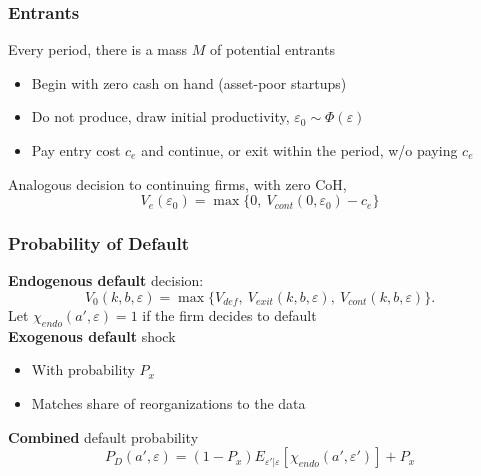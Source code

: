 \documentclass[aspectratio=169,xcolor=table]{beamer}
\begin{document}
\begin{frame}[label=Entrants] \frametitle{Entrants \hfill \hyperlink{Firmvalues}{}}

Every period, there is a mass $M$ of potential entrants
\begin{itemize} \small
    \item Begin with zero cash on hand (asset-poor startups)  
    \item Do not produce, draw initial productivity, $\varepsilon_0 \sim \Phi(\varepsilon)$  
    \item Pay entry cost $c_e$ and continue, or exit within the period, w/o paying $c_e$
\end{itemize} \normalsize \vspace{5mm}

Analogous decision to continuing firms, with zero CoH,
\begin{equation*} \label{eq:entrant decision}
V_e(\varepsilon_0) = \max \{0, \ V_{cont}(0,\varepsilon_0) - c_e \}
\end{equation*}


\end{frame}

\begin{frame}[label=Default] \frametitle{Probability of Default \hfill \hyperlink{LiqReorg}{}}
\textbf{Endogenous default} decision:
\begin{equation*} \label{eq:default decision}
    V_0(k,b,\varepsilon) = \max \{V_{def}, \  V_{exit}(k,b,\varepsilon),  \ V_{cont}(k,b,\varepsilon) \}.
\end{equation*}
Let $\chi_{endo}(a', \varepsilon) = 1$ if the firm decides to default \vspace{3mm} \\

\textbf{Exogenous default} shock 
\begin{itemize} \small
    \item With probability $P_{x}$
    \item Matches share of reorganizations to the data
\end{itemize} \normalsize

\textbf{Combined} default probability 
$$  P_D(a', \varepsilon) = (1-P_x)E_{\varepsilon'|\varepsilon}[\chi_{endo}(a',\varepsilon')] + P_{x}  $$


\end{frame}
\end{document}
